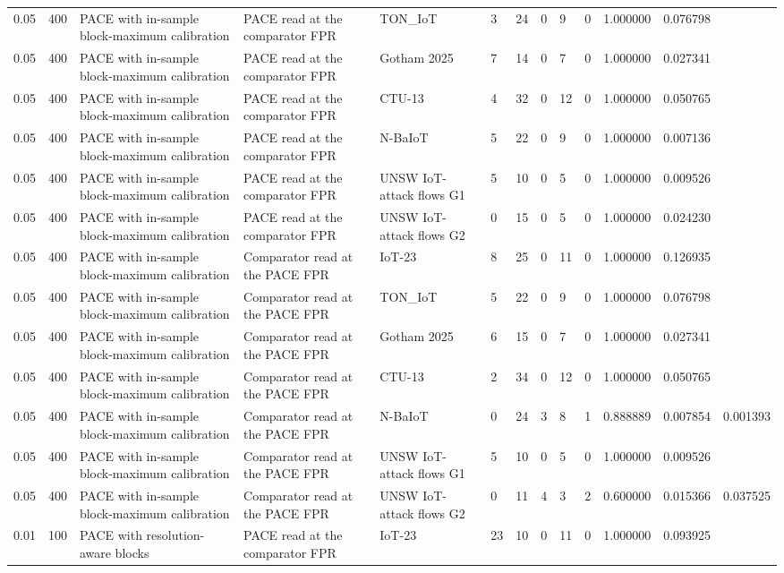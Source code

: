 \begin{tabular}{lllllllllllll}
0.05 & 400 & PACE with in-sample block-maximum calibration & PACE read at the comparator FPR & TON\_IoT & 3 & 24 & 0 & 9 & 0 & 1.000000 & 0.076798 &  \\
0.05 & 400 & PACE with in-sample block-maximum calibration & PACE read at the comparator FPR & Gotham 2025 & 7 & 14 & 0 & 7 & 0 & 1.000000 & 0.027341 &  \\
0.05 & 400 & PACE with in-sample block-maximum calibration & PACE read at the comparator FPR & CTU-13 & 4 & 32 & 0 & 12 & 0 & 1.000000 & 0.050765 &  \\
0.05 & 400 & PACE with in-sample block-maximum calibration & PACE read at the comparator FPR & N-BaIoT & 5 & 22 & 0 & 9 & 0 & 1.000000 & 0.007136 &  \\
0.05 & 400 & PACE with in-sample block-maximum calibration & PACE read at the comparator FPR & UNSW IoT-attack flows G1 & 5 & 10 & 0 & 5 & 0 & 1.000000 & 0.009526 &  \\
0.05 & 400 & PACE with in-sample block-maximum calibration & PACE read at the comparator FPR & UNSW IoT-attack flows G2 & 0 & 15 & 0 & 5 & 0 & 1.000000 & 0.024230 &  \\
0.05 & 400 & PACE with in-sample block-maximum calibration & Comparator read at the PACE FPR & IoT-23 & 8 & 25 & 0 & 11 & 0 & 1.000000 & 0.126935 &  \\
0.05 & 400 & PACE with in-sample block-maximum calibration & Comparator read at the PACE FPR & TON\_IoT & 5 & 22 & 0 & 9 & 0 & 1.000000 & 0.076798 &  \\
0.05 & 400 & PACE with in-sample block-maximum calibration & Comparator read at the PACE FPR & Gotham 2025 & 6 & 15 & 0 & 7 & 0 & 1.000000 & 0.027341 &  \\
0.05 & 400 & PACE with in-sample block-maximum calibration & Comparator read at the PACE FPR & CTU-13 & 2 & 34 & 0 & 12 & 0 & 1.000000 & 0.050765 &  \\
0.05 & 400 & PACE with in-sample block-maximum calibration & Comparator read at the PACE FPR & N-BaIoT & 0 & 24 & 3 & 8 & 1 & 0.888889 & 0.007854 & 0.001393 \\
0.05 & 400 & PACE with in-sample block-maximum calibration & Comparator read at the PACE FPR & UNSW IoT-attack flows G1 & 5 & 10 & 0 & 5 & 0 & 1.000000 & 0.009526 &  \\
0.05 & 400 & PACE with in-sample block-maximum calibration & Comparator read at the PACE FPR & UNSW IoT-attack flows G2 & 0 & 11 & 4 & 3 & 2 & 0.600000 & 0.015366 & 0.037525 \\
0.01 & 100 & PACE with resolution-aware blocks & PACE read at the comparator FPR & IoT-23 & 23 & 10 & 0 & 11 & 0 & 1.000000 & 0.093925 &  \\

\end{tabular}
